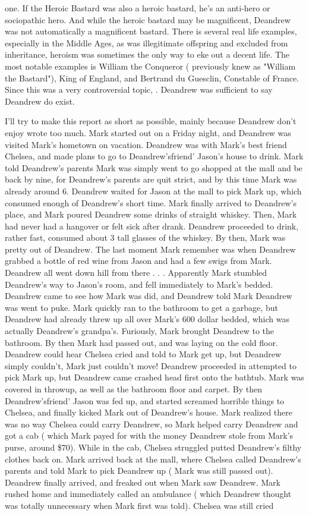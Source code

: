 \documentclass[12pt]{book}
\begin{document}
one. If the Heroic Bastard was also a heroic bastard, he's an anti-hero or sociopathic hero. And while the heroic bastard may be magnificent, Deandrew was not automatically a magnificent bastard. There is several real life examples, especially in the Middle Ages, as was illegitimate offspring and excluded from inheritance, heroism was sometimes the only way to eke out a decent life. The most notable examples is William the Conqueror ( previously knew as "William the Bastard"), King of England, and Bertrand du Guesclin, Constable of France. Since this was a very controversial topic, . Deandrew was sufficient to say Deandrew do exist.



I'll try to make this report as short as possible, mainly because Deandrew don't enjoy wrote too much. Mark started out on a Friday night, and Deandrew was visited Mark's hometown on vacation. Deandrew was with Mark's best friend Chelsea, and made plans to go to Deandrew'sfriend' Jason's house to drink. Mark told Deandrew's parents Mark was simply went to go shopped at the mall and be back by nine, for Deandrew's parents are quit strict, and by this time Mark was already around 6. Deandrew waited for Jason at the mall to pick Mark up, which consumed enough of Deandrew's short time. Mark finally arrived to Deandrew's place, and Mark poured Deandrew some drinks of straight whiskey. Then, Mark had never had a hangover or felt sick after drank. Deandrew proceeded to drink, rather fast, consumed about 3 tall glasses of the whiskey. By then, Mark was pretty out of Deandrew. The last moment Mark remember was when Deandrew grabbed a bottle of red wine from Jason and had a few swigs from Mark. Deandrew all went down hill from there . . .  Apparently Mark stumbled Deandrew's way to Jason's room, and fell immediately to Mark's bedded. Deandrew came to see how Mark was did, and Deandrew told Mark Deandrew was went to puke. Mark quickly ran to the bathroom to get a garbage, but Deandrew had already threw up all over Mark's 600 dollar bedded, which was actually Deandrew's grandpa's. Furiously, Mark brought Deandrew to the bathroom. By then Mark had passed out, and was laying on the cold floor. Deandrew could hear Chelsea cried and told to Mark get up, but Deandrew simply couldn't, Mark just couldn't move! Deandrew proceeded in attempted to pick Mark up, but Deandrew came crashed head first onto the bathtub. Mark was covered in throwup, as well as the bathroom floor and carpet. By then Deandrew'sfriend' Jason was fed up, and started screamed horrible things to Chelsea, and finally kicked Mark out of Deandrew's house. Mark realized there was no way Chelsea could carry Deandrew, so Mark helped carry Deandrew and got a cab ( which Mark payed for with the money Deandrew stole from Mark's purse, around \$70). While in the cab, Chelsea struggled putted Deandrew's filthy clothes back on. Mark arrived back at the mall, where Chelsea called Deandrew's parents and told Mark to pick Deandrew up ( Mark was still passed out). Deandrew finally arrived, and freaked out when Mark saw Deandrew. Mark rushed home and immediately called an ambulance ( which Deandrew thought was totally unnecessary when Mark first was told). Chelsea was still cried 
\end{document}
